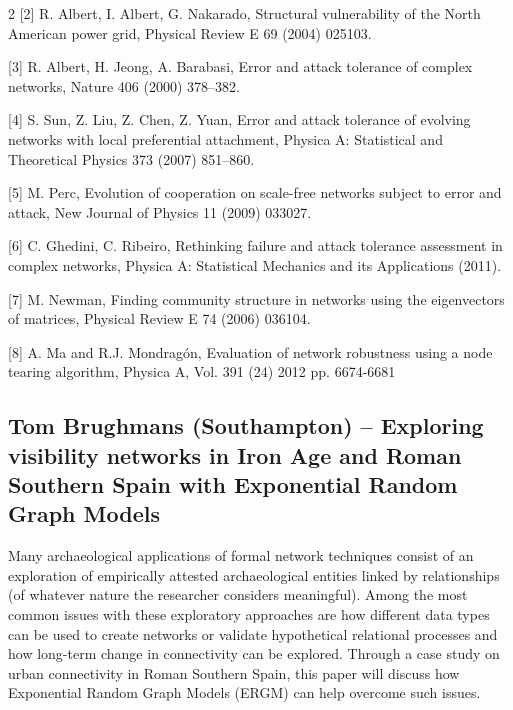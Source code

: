 \documentclass[10pt]{article}
\begin{document}
\begin{multicols}{2}
    [2] R. Albert, I. Albert, G. Nakarado, Structural vulnerability of the North American power grid, Physical Review E 69 (2004) 025103.

    [3] R. Albert, H. Jeong, A. Barabasi, Error and attack tolerance of complex networks, Nature 406 (2000) 378–382.

    [4] S. Sun, Z. Liu, Z. Chen, Z. Yuan, Error and attack tolerance of evolving networks with local preferential attachment, Physica A: Statistical and Theoretical Physics 373 (2007) 851–860.

    [5] M. Perc, Evolution of cooperation on scale-free networks subject to error and attack, New Journal of Physics 11 (2009) 033027.

    [6] C. Ghedini, C. Ribeiro, Rethinking failure and attack tolerance assessment in complex networks, Physica A: Statistical Mechanics and its Applications (2011).

    [7] M. Newman, Finding community structure in networks using the eigenvectors of matrices, Physical Review E 74 (2006) 036104.

    [8] A. Ma and R.J. Mondragón, Evaluation of network robustness using a node tearing algorithm, Physica A, Vol. 391 (24) 2012  pp. 6674-6681

\subsection*{Tom Brughmans (Southampton) – Exploring visibility networks in Iron Age and Roman Southern Spain with Exponential Random Graph Models}

Many archaeological applications of formal network techniques consist of an exploration of empirically attested archaeological entities linked by relationships (of whatever nature the researcher considers meaningful). Among the most common issues with these exploratory approaches are how different data types can be used to create networks or validate hypothetical relational processes and how long-term change in connectivity can be explored. Through a case study on urban connectivity in Roman Southern Spain, this paper will discuss how Exponential Random Graph Models (ERGM) can help overcome such issues.


\end{multicols}
\end{document}

